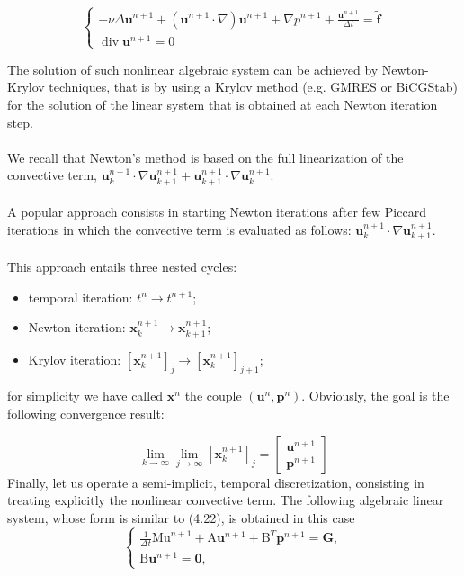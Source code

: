 \documentclass[11pt]{book}
\begin{document}
$$
\left\{\begin{array}{l}
-\nu \Delta \mathbf{u}^{n+1}+\left(\mathbf{u}^{n+1} \cdot \nabla\right) \mathbf{u}^{n+1}+\nabla p^{n+1}+\frac{\mathbf{u}^{n+1}}{\Delta t}=\tilde{\mathbf{f}} \\
\operatorname{div} \mathbf{u}^{n+1}=0
\end{array}\right.
$$

 The solution of such nonlinear algebraic system can be achieved by Newton-Krylov techniques, that is by using a Krylov method (e.g. GMRES or BiCGStab) for the solution of the linear system that is obtained at each Newton iteration step.\\\\
 We recall that Newton's method is based on the full linearization of the convective term, $\mathbf{u}_k^{n+1} \cdot \nabla \mathbf{u}_{k+1}^{n+1}+\mathbf{u}_{k+1}^{n+1} \cdot \nabla \mathbf{u}_k^{n+1}$. \\ \\
A popular approach consists in starting Newton iterations after few Piccard iterations in which the convective term is evaluated as follows: $\mathbf{u}_{k}^{n+1} \cdot \nabla \mathbf{u}_{k+1}^{n+1}$. \\ \\ 
This approach entails three nested cycles:
\begin{itemize}
  \item temporal iteration: $t^{n} \rightarrow t^{n+1}$;
  \item Newton iteration: $\mathbf{x}_{k}^{n+1} \rightarrow \mathbf{x}_{k+1}^{n+1}$;
  \item Krylov iteration: $\left[\mathbf{x}_{k}^{n+1}\right]_{j} \rightarrow\left[\mathbf{x}_{k}^{n+1}\right]_{j+1}$;
\end{itemize}

for simplicity we have called $\mathbf{x}^{n}$ the couple $\left(\mathbf{u}^{n}, \mathbf{p}^{n}\right)$. Obviously, the goal is the following convergence result:

$$
\lim _{k \rightarrow \infty} \lim _{j \rightarrow \infty}\left[\mathbf{x}_{k}^{n+1}\right]_{j}=\left[\begin{array}{l}
\mathbf{u}^{n+1} \\
\mathbf{p}^{n+1}
\end{array}\right]
$$
Finally, let us operate a semi-implicit, temporal discretization, consisting in treating explicitly the nonlinear convective term. The following algebraic linear system, whose form is similar to (4.22), is obtained in this case
\begin{equation}
\left\{\begin{array}{l}
\frac{1}{\Delta t} \mathrm{Mu}^{n+1}+\mathrm{A} \mathbf{u}^{n+1}+\mathrm{B}^{T} \mathbf{p}^{n+1}=\mathbf{G}, \\
\mathrm{B} \mathbf{u}^{n+1}=\mathbf{0},
\end{array}\right.
\end{equation}
\end{document}
